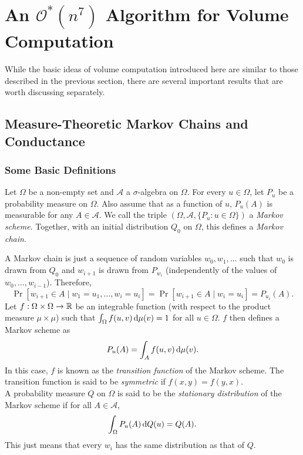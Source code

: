 \section{An \texorpdfstring{$\mathcal{O}^*(n^7)$}{} Algorithm for Volume Computation}

While the basic ideas of volume computation introduced here are similar to those described in the previous section, there are several important results that are worth discussing separately.

\subsection{Measure-Theoretic Markov Chains and Conductance}
\label{subsec: measure theoretic markov chains}

\subsubsection{Some Basic Definitions}

\begin{fdef}
Let $\Omega$ be a non-empty set and $\mathcal{A}$ a $\sigma$-algebra on $\Omega$. For every $u\in\Omega$, let $P_u$ be a probability measure on $\Omega$. Also assume that as a function of $u$, $P_u(A)$ is measurable for any $A\in\mathcal{A}$. We call the triple $(\Omega,\mathcal{A},\{P_u:u\in\Omega\})$ a \textit{Markov scheme}. Together, with an initial distribution $Q_0$ on $\Omega$, this defines a \textit{Markov chain}.
\end{fdef}

A Markov chain is just a sequence of random variables $w_0,w_1,\ldots$ such that $w_0$ is drawn from $Q_0$ and $w_{i+1}$ is drawn from $P_{w_i}$ (independently of the values of $w_0,\ldots,w_{i-1}$). Therefore,
\[ \Pr[w_{i+1}\in A \mid w_1=u_1,\ldots,w_i=u_i] = \Pr[w_{i+1}\in A\mid w_i=u_i] = P_{u_i}(A). \]
Let $f:\Omega\times\Omega\to\mathbb{R}$ be an integrable function (with respect to the product measure $\mu\times\mu$) such that $\int_\Omega f(u,v)\operatorname{d}\!{\mu}(v)=1$ for all $u\in\Omega$. $f$ then defines a Markov scheme as
\[ P_u(A) = \int_A f(u,v)\operatorname{d}\!{\mu}(v). \]
In this case, $f$ is known as the \textit{transition function} of the Markov scheme. The transition function is said to be \textit{symmetric} if $f(x,y)=f(y,x)$.\\

A probability measure $Q$ on $\Omega$ is said to be the \textit{stationary distribution} of the Markov scheme if for all $A\in\mathcal{A}$,
\[ \int_{\Omega}P_u(A)\operatorname{d}\!{Q}(u) = Q(A). \]
This just means that every $w_i$ has the same distribution as that of $Q$.\\

